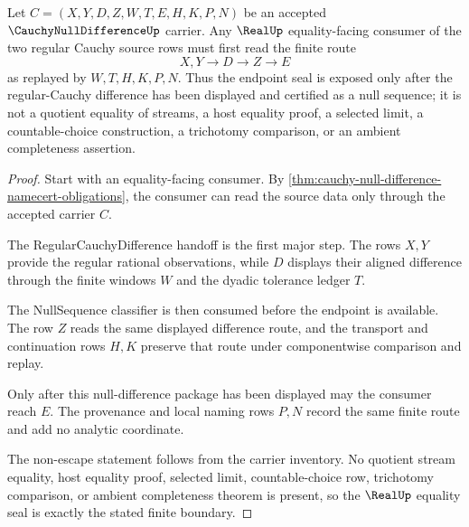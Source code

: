 \begin{theorem}
\label{thm:cauchy-null-difference-real-seal-boundary}
Let $C=(X,Y,D,Z,W,T,E,H,K,P,N)$ be an accepted $\CauchyNullDifferenceUp$ carrier. Any $\RealUp$ equality-facing consumer of the two regular Cauchy source rows must first read the finite route
$$
X,Y \longrightarrow D \longrightarrow Z \longrightarrow E
$$
as replayed by $W,T,H,K,P,N$. Thus the endpoint seal is exposed only after the regular-Cauchy difference has been displayed and certified as a null sequence; it is not a quotient equality of streams, a host equality proof, a selected limit, a countable-choice construction, a trichotomy comparison, or an ambient completeness assertion.
\end{theorem}
\begin{proof}
Start with an equality-facing consumer. By \autoref{thm:cauchy-null-difference-namecert-obligations}, the consumer can read the source data only through the accepted carrier $C$.

The RegularCauchyDifference handoff is the first major step. The rows $X,Y$ provide the regular rational observations, while $D$ displays their aligned difference through the finite windows $W$ and the dyadic tolerance ledger $T$.

The NullSequence classifier is then consumed before the endpoint is available. The row $Z$ reads the same displayed difference route, and the transport and continuation rows $H,K$ preserve that route under componentwise comparison and replay.

Only after this null-difference package has been displayed may the consumer reach $E$. The provenance and local naming rows $P,N$ record the same finite route and add no analytic coordinate.

The non-escape statement follows from the carrier inventory. No quotient stream equality, host equality proof, selected limit, countable-choice row, trichotomy comparison, or ambient completeness theorem is present, so the $\RealUp$ equality seal is exactly the stated finite boundary.
\end{proof}


